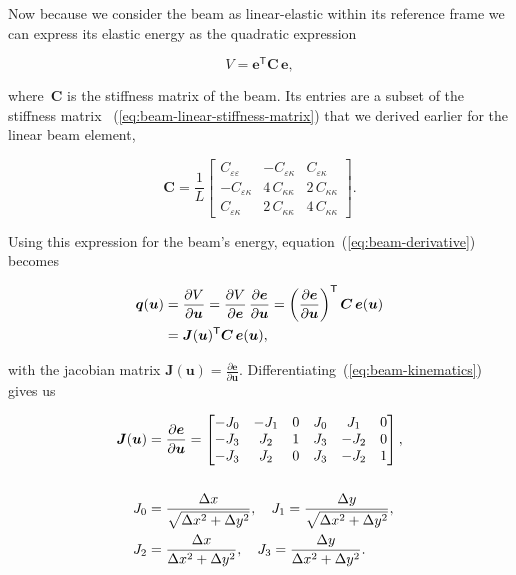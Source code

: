 Now because we consider the beam as linear-elastic within its reference frame we can express its elastic energy as the quadratic expression

\begin{equation}
V = \boldsymbol{e}^\mathsf{T} \boldsymbol{C}\,\boldsymbol{e},
\end{equation}

where~$\boldsymbol{C}$ is the stiffness matrix of the beam. Its entries are a subset of the stiffness matrix ~(\ref{eq:beam-linear-stiffness-matrix}) that we derived earlier for the linear beam element,

\begin{equation}
\boldsymbol{C} =
\frac{1}{L}
\begin{bmatrix}
C_{\varepsilon\varepsilon} & -C_{\varepsilon\kappa} & C_{\varepsilon\kappa}\\
-C_{\varepsilon\kappa} & 4\,C_{\kappa\kappa} & 2\,C_{\kappa\kappa}\\
C_{\varepsilon\kappa} & 2\,C_{\kappa\kappa} & 4\,C_{\kappa\kappa}
\end{bmatrix}.
\end{equation}

Using this expression for the beam's energy, equation~(\ref{eq:beam-derivative}) becomes

\begin{align}
\boldsymbol{q}(\boldsymbol{u}) &= \frac{\partial V}{\partial \boldsymbol{u}} =  \frac{\partial V}{\partial \boldsymbol{e}}\,\frac{\partial \boldsymbol{e}}{\partial \boldsymbol{u}} = \left(\frac{\partial \boldsymbol{e}}{\partial \boldsymbol{u}}\right)^\mathsf{T}\boldsymbol{C}\,\boldsymbol{e}(\boldsymbol{u})\notag\\
&= \boldsymbol{J}(\boldsymbol{u})^\mathsf{T}\boldsymbol{C}\,\boldsymbol{e}(\boldsymbol{u}),
\end{align}

with the jacobian matrix $\boldsymbol{J}(\boldsymbol{u}) = \frac{\partial \boldsymbol{e}}{\partial \boldsymbol{u}}$. Differentiating~(\ref{eq:beam-kinematics}) gives us

\begin{align}
\boldsymbol{J}(\boldsymbol{u}) &= \frac{\partial \boldsymbol{e}}{\partial \boldsymbol{u}} =
\begin{bmatrix}
-J_{0} & -J_{1} & 0 & J_{0} & J_{1} & 0\\
-J_{3} & J_{2} & 1 & J_{3} & -J_{2} & 0\\
-J_{3} & J_{2} & 0 & J_{3} & -J_{2} & 1
\end{bmatrix},\\
\notag\\
J_{0} &= \frac{\Delta x}{\sqrt{\Delta x^2 + \Delta y^2}},\quad J_{1} = \frac{\Delta y}{\sqrt{\Delta x^2 + \Delta y^2}},\notag\\
\quad J_{2} &= \frac{\Delta x}{\Delta x^2 + \Delta y^2},\quad J_{3} = \frac{\Delta y}{\Delta x^2 + \Delta y^2}.
\end{align}

